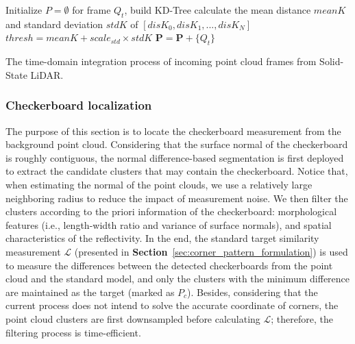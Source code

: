 \documentclass[journal]{vgtc}
\begin{document}
\IncMargin{1em} 
\begin{algorithm}[!ht]
	\SetAlgoNoLine
	\BlankLine
	Initialize $P = \emptyset $\;
	\Repeat
	{}
	{
		for frame $Q_t$, build KD-Tree\;
		calculate the mean distance $meanK$ and standard deviation $stdK$ of $[disK_0, disK_1, ..., disK_N]$\;
		$thresh = meanK + scale_{std} \times stdK $\;
		$\bm P = \bm P + \{ Q_t \}$\;
	}
	\caption{The time-domain integration process of incoming point cloud frames from Solid-State LiDAR.}
	\label{alg:integration}
\end{algorithm}
\DecMargin{1em}

\subsubsection{Checkerboard localization}


The purpose of this section is to locate the checkerboard measurement from the background point cloud. Considering that the surface normal of the checkerboard is roughly contiguous, the normal difference-based segmentation\cite{ioannou2012difference} is first deployed to extract the candidate clusters that may contain the checkerboard. Notice that, when estimating the normal of the point clouds, we use a relatively large neighboring radius to reduce the impact of measurement noise. We then filter the clusters according to the priori information of the checkerboard: morphological features (i.e., length-width ratio and variance of surface normals), and spatial characteristics of the reflectivity. In the end, the standard target similarity measurement $\mathcal{L}$ (presented in \textbf{Section}~\ref{sec:corner_pattern_formulation}) is used to measure the differences between the detected checkerboards from the point cloud and the standard model, and only the clusters with the minimum difference are maintained as the target (marked as $P_c$). Besides, considering that the current process does not intend to solve the accurate coordinate of corners, the point cloud clusters are first downsampled before calculating $\mathcal{L}$; therefore, the filtering process is time-efficient.
\end{document}
